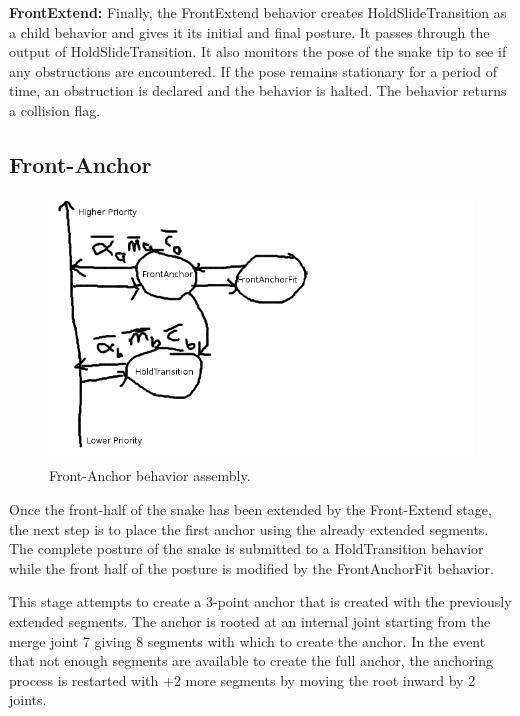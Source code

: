\textbf{FrontExtend:}  Finally, the FrontExtend behavior creates HoldSlideTransition as a child behavior and gives it its initial and final posture.  It passes through the output of HoldSlideTransition.  It also monitors the pose of the snake tip to see if any obstructions are encountered.  If the pose remains stationary for a period of time, an obstruction is declared and the behavior is halted.  The behavior returns a collision flag.

\subsection{Front-Anchor}

\begin{figure}
\begin{center}
\includegraphics[scale=0.5]{2_adaptive_2.png}
\end{center}
\caption{Front-Anchor behavior assembly.}
\label{adaptive2}
\end{figure}


Once the front-half of the snake has been extended by the Front-Extend stage, the next step is to place the first anchor using the already extended segments.  The complete posture of the snake is submitted to a HoldTransition behavior while the front half of the posture is modified by the FrontAnchorFit behavior.

This stage attempts to create a 3-point anchor that is created with the previously extended segments.  The anchor is rooted at an internal joint starting from the merge joint 7 giving 8 segments with which to create the anchor.  In the event that not enough segments are available to create the full anchor, the anchoring process is restarted with +2 more segments by moving the root inward by 2 joints.  

